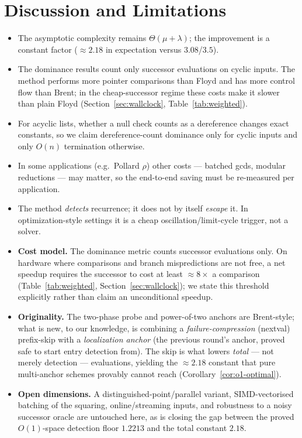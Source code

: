\documentclass[11pt]{article}
\begin{document}
\section{Discussion and Limitations}
\label{sec:limits}
\begin{itemize}[leftmargin=2em,itemsep=2pt]
  \item The asymptotic complexity remains $\Theta(\mu+\lambda)$; the improvement
        is a constant factor ($\approx2.18$ in expectation versus $3.08$/$3.5$).
  \item The dominance results count only successor evaluations on cyclic inputs.
        The method performs more pointer comparisons than Floyd and has more
        control flow than Brent; in the cheap-successor regime these costs make
        it slower than plain Floyd (Section~\ref{sec:wallclock},
        Table~\ref{tab:weighted}).
  \item For acyclic lists, whether a null check counts as a dereference changes
        exact constants, so we claim dereference-count dominance only for cyclic
        inputs and only $O(n)$ termination otherwise.
  \item In some applications (e.g.\ Pollard $\rho$) other costs --- batched gcds,
        modular reductions --- may matter, so the end-to-end saving must be
        re-measured per application.
  \item The method \emph{detects} recurrence; it does not by itself \emph{escape}
        it. In optimization-style settings it is a cheap oscillation/limit-cycle
        trigger, not a solver.
  \item \textbf{Cost model.} The dominance metric counts successor evaluations
        only. On hardware where comparisons and branch mispredictions are not
        free, a net speedup requires the successor to cost at least
        $\approx8\times$ a comparison (Table~\ref{tab:weighted},
        Section~\ref{sec:wallclock}); we state this threshold explicitly rather
        than claim an unconditional speedup.
  \item \textbf{Originality.} The two-phase probe and power-of-two anchors are
        Brent-style; what is new, to our knowledge, is combining a
        \emph{failure-compression} (nextval) prefix-skip with a
        \emph{localization anchor} (the previous round's anchor, proved safe to
        start entry detection from). The skip is what lowers \emph{total} --- not
        merely detection --- evaluations, yielding the $\approx2.18$ constant that
        pure multi-anchor schemes provably cannot reach
        (Corollary~\ref{cor:o1-optimal}).
  \item \textbf{Open dimensions.} A distinguished-point/parallel variant,
        SIMD-vectorised batching of the squaring, online/streaming inputs, and
        robustness to a noisy successor oracle are untouched here, as is closing
        the gap between the proved $O(1)$-space detection floor $1.2213$ and the
        total constant $2.18$.
\end{itemize}
\end{document}
